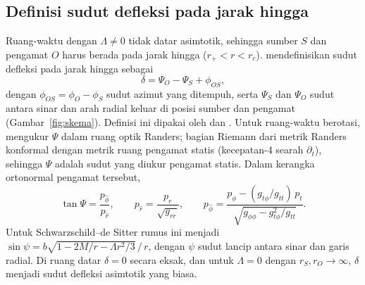 \documentclass[11pt,a4paper]{article}
\begin{document}
\subsection{Definisi sudut defleksi pada jarak hingga}
\label{subsec:definisi}

Ruang-waktu dengan $\Lambda \ne 0$ tidak datar asimtotik, sehingga sumber $S$ dan pengamat $O$ harus
berada pada jarak hingga ($r_+ < r < r_c$). \citet{ishihara2016gravitational} mendefinisikan sudut
defleksi pada jarak hingga sebagai
\begin{equation}
  \delta = \Psi_O - \Psi_S + \phi_{OS},
  \label{eq:definisi}
\end{equation}
dengan $\phi_{OS} = \phi_O - \phi_S$ sudut azimut yang ditempuh, serta $\Psi_S$ dan $\Psi_O$ sudut antara
sinar dan arah radial keluar di posisi sumber dan pengamat (Gambar~\ref{fig:skema}). Definisi ini dipakai
oleh \citet[Pers.~2.1]{belhaj2022light} dan \citet[Pers.~12]{huang2025influence}. Untuk ruang-waktu
berotasi, \citeauthor{huang2025influence} mengukur $\Psi$ dalam ruang optik Randers; bagian Riemann dari
metrik Randers konformal dengan metrik ruang pengamat statis (kecepatan-4 searah $\partial_t$), sehingga
$\Psi$ adalah sudut yang diukur pengamat statis. Dalam kerangka ortonormal pengamat tersebut,
\begin{equation}
  \tan\Psi = \frac{p_{\hat\phi}}{p_{\hat r}}, \qquad
  p_{\hat r} = \frac{p_r}{\sqrt{g_{rr}}}, \qquad
  p_{\hat\phi} = \frac{p_\phi - (g_{t\phi}/g_{tt})\,p_t}{\sqrt{g_{\phi\phi} - g_{t\phi}^2/g_{tt}}}.
  \label{eq:psi}
\end{equation}
Untuk Schwarzschild--de Sitter rumus ini menjadi $\sin\psi = b\sqrt{1 - 2M/r - \Lambda r^2/3}\,/\,r$,
dengan $\psi$ sudut lancip antara sinar dan garis radial. Di ruang datar $\delta = 0$ secara eksak, dan
untuk $\Lambda = 0$ dengan $r_S, r_O \to \infty$, $\delta$ menjadi sudut defleksi asimtotik yang biasa.
\end{document}
